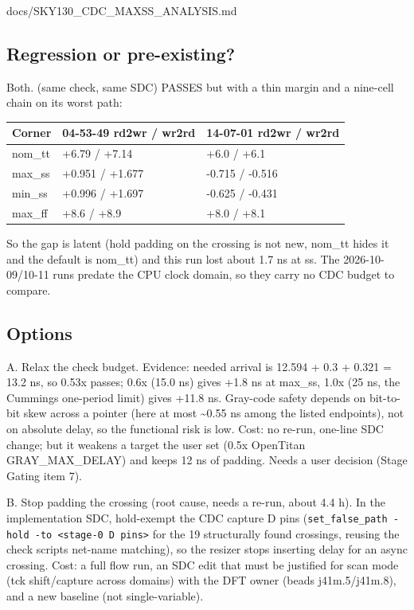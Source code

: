 \begin{relocated}{docs/SKY130_CDC_MAXSS_ANALYSIS.md}
\subsection{Regression or pre-existing?}\label{tm:pd:sky130-cdc-maxss:3-regression-or-pre-existing}

Both.  (same check, same SDC) PASSES but
with a thin margin and a nine-cell chain on its worst path:

{
\begin{longtable}[]{@{}lll@{}}
\toprule\noalign{}
Corner & 04-53-49 rd2wr / wr2rd & 14-07-01 rd2wr / wr2rd \\
\midrule\noalign{}
\endhead
\bottomrule\noalign{}
\endlastfoot
nom\_tt & +6.79 / +7.14 & +6.0 / +6.1 \\
max\_ss & +0.951 / +1.677 & -0.715 / -0.516 \\
min\_ss & +0.996 / +1.697 & -0.625 / -0.431 \\
max\_ff & +8.6 / +8.9 & +8.0 / +8.1 \\
\end{longtable}
}

So the gap is latent (hold padding on the crossing is not new, nom\_tt
hides it and the default  is nom\_tt) and this run lost
about 1.7 ns at ss. The 2026-10-09/\allowbreak{}10-11 runs predate the
CPU clock domain, so they carry no CDC budget to compare.

\subsection{Options}\label{tm:pd:sky130-cdc-maxss:4-options}

A. Relax the check budget. Evidence: needed arrival is 12.594 + 0.3 +
0.321 = 13.2 ns, so 0.53x passes; 0.6x (15.0 ns) gives +1.8 ns at
max\_ss, 1.0x (25 ns, the Cummings one-period limit) gives +11.8 ns.
Gray-code safety depends on bit-to-bit skew across a pointer (here at
most \textasciitilde0.55 ns among the listed endpoints), not on absolute
delay, so the functional risk is low. Cost: no re-run, one-line SDC
change; but it weakens a target the user set (0.5x OpenTitan
GRAY\_\allowbreak{}MAX\_\allowbreak{}DELAY) and keeps 12 ns of padding.
Needs a user decision (Stage Gating item 7).

B. Stop padding the crossing (root cause, needs a re-run, about 4.4 h).
In the implementation SDC, hold-exempt the CDC capture D pins
(\texttt{set\_\allowbreak{}false\_\allowbreak{}path\ -\allowbreak{}hold\ -\allowbreak{}to\ <stage-\allowbreak{}0\ D\ pins>}
for the 19 structurally found crossings, reusing the check
script\textquotesingle s net-name matching), so the resizer stops
inserting delay for an async crossing. Cost: a full flow run, an SDC
edit that must be justified for scan mode (tck
shift/\allowbreak{}capture across domains) with the DFT owner (beads
j41m.5/\allowbreak{}j41m.8), and a new baseline (not single-variable).


\end{relocated}
